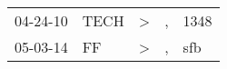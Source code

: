 \begin{supertabular}{lllll}
 04-24-10 &  TECH &  \textgreater &  , &  1348 \\
 05-03-14 &    FF &  \textgreater &  , &   sfb \\
\end{supertabular}
